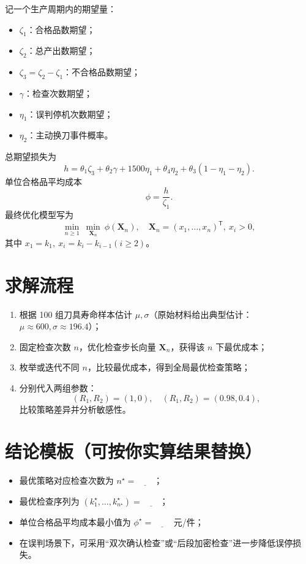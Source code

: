 \documentclass[12pt,a4paper]{ctexart}
\begin{document}
记一个生产周期内的期望量：
\begin{itemize}
  \item $\zeta_1$：合格品数期望；
  \item $\zeta_2$：总产出数期望；
  \item $\zeta_3=\zeta_2-\zeta_1$：不合格品数期望；
  \item $\gamma$：检查次数期望；
  \item $\eta_1$：误判停机次数期望；
  \item $\eta_2$：主动换刀事件概率。
\end{itemize}

总期望损失为
\[
h=\theta_1\zeta_3+\theta_2\gamma+1500\eta_1+\theta_4\eta_2+\theta_3(1-\eta_1-\eta_2).
\]
单位合格品平均成本
\[
\phi=\frac{h}{\zeta_1}.
\]
最终优化模型写为
\[
\min_{n\ge 1}\ \min_{\mathbf X_n}\ \phi(\mathbf X_n),\quad
\mathbf X_n=(x_1,\ldots,x_n)^\mathsf T,\ x_i>0,
\]
其中 $x_1=k_1,\ x_i=k_i-k_{i-1}(i\ge2)$。

\section{求解流程}
\begin{enumerate}
  \item 根据 100 组刀具寿命样本估计 $\mu,\sigma$（原始材料给出典型估计：$\mu\approx600,\sigma\approx196.4$）；
  \item 固定检查次数 $n$，优化检查步长向量 $\mathbf X_n$，获得该 $n$ 下最优成本；
  \item 枚举或迭代不同 $n$，比较最优成本，得到全局最优检查策略；
  \item 分别代入两组参数：
  \[
  (R_1,R_2)=(1,0),\quad (R_1,R_2)=(0.98,0.4),
  \]
  比较策略差异并分析敏感性。
\end{enumerate}

\section{结论模板（可按你实算结果替换）}
\begin{itemize}
  \item 最优策略对应检查次数为 $n^\star=\underline{\qquad}$；
  \item 最优检查序列为 $(k_1^\star,\ldots,k_{n^\star}^\star)=\underline{\qquad}$；
  \item 单位合格品平均成本最小值为 $\phi^\star=\underline{\qquad}$ 元/件；
  \item 在误判场景下，可采用“双次确认检查”或“后段加密检查”进一步降低误停损失。
\end{itemize}
\end{document}
